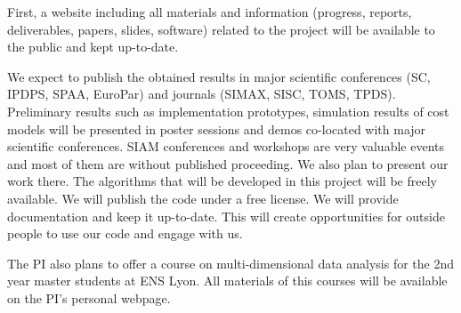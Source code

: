 \documentclass[a4paper,11pt]{article}
\begin{document}
	First, a website including all materials and information (progress, reports, deliverables, papers, slides, software) related to the project will be available to the public and kept up-to-date.
	
	
	We expect to publish the obtained results in major scientific conferences (SC, IPDPS, SPAA, EuroPar) and journals (SIMAX, SISC, TOMS, TPDS). Preliminary results such as implementation prototypes, simulation results of cost models will be presented in poster sessions and demos co-located with major scientific conferences. SIAM conferences and workshops are very valuable events and most of them are without published proceeding. We also plan to present our work there. The algorithms that will be developed in this project will be freely available. We will publish the code under a free license. We will provide documentation and keep it up-to-date. This will create opportunities for outside people to use our code and engage with us.
	
	
	The PI also plans to offer a course on multi-dimensional data analysis for the 2nd year master students at ENS Lyon. All materials of this courses will be available on the PI's personal webpage.
	
	

	
	{\footnotesize
		
		
	}
	
\end{document}

